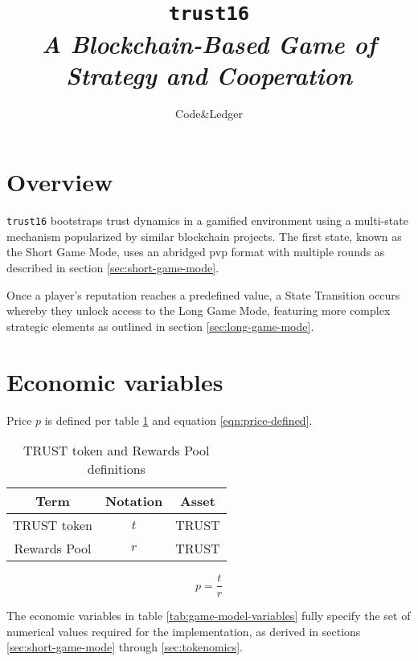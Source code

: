 \documentclass[table, twocolumn]{article}
\title{%
  \Huge \texttt{trust16} \\ \vspace{10pt}
  \small \emph{A Blockchain-Based Game of Strategy and Cooperation}
}
\author{Code&Ledger}
\date{}
\begin{document}
\maketitle

\section{Overview} \label{sec:overview}

\texttt{trust16} bootstraps trust dynamics in a gamified environment using a
multi-state mechanism popularized by similar blockchain projects. The first state,
known as the Short Game Mode, uses an abridged \gls{pvp} format with multiple rounds
as described in section \ref{sec:short-game-mode}.

Once a player's reputation reaches a predefined value, a State Transition occurs
whereby they unlock access to the Long Game Mode, featuring more complex strategic
elements as outlined in section \ref{sec:long-game-mode}.

\section{Economic variables}

Price $p$ is defined per table \ref{tab:t-r-definitions} and equation
\ref{eqn:price-defined}.

\begin{table}[!htb]
  \centering
  \begin{tabular}{|c|c|c|}
    \hline \rowcolor{gray!20}
    Term          & Notation & Asset        \\ \hline
    TRUST token   & $t$      & TRUST        \\ \hline
    Rewards Pool  & $r$      & TRUST        \\ \hline
  \end{tabular}
  \caption{TRUST token and Rewards Pool definitions}
  \label{tab:t-r-definitions}
\end{table}

\begin{equation} \label{eqn:price-defined}
  p = \frac{t}{r}
\end{equation}

The economic variables in table \ref{tab:game-model-variables} fully specify the set of
numerical values required for the implementation, as derived in sections
\ref{sec:short-game-mode} through \ref{sec:tokenomics}.
\end{document}
